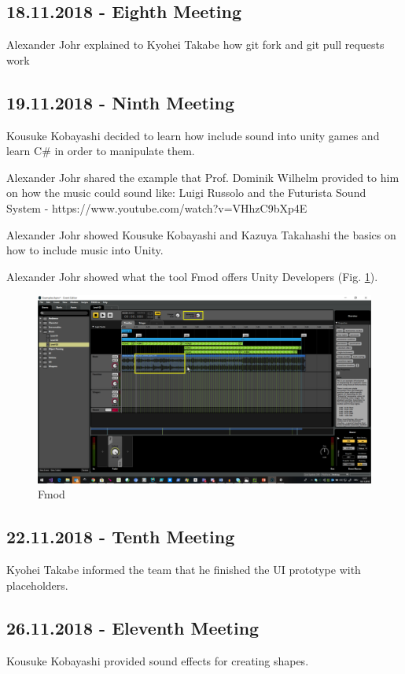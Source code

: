 \subsection{18.11.2018 - Eighth Meeting}
Alexander Johr explained to Kyohei Takabe how git fork and git pull requests work


\subsection{19.11.2018 - Ninth Meeting}
Kousuke Kobayashi decided to learn how include sound into unity games and learn C\# in order to manipulate them.

Alexander Johr shared the example that Prof. Dominik Wilhelm provided to him on how the music could sound like: Luigi Russolo and the Futurista Sound System - https://www.youtube.com/watch?v=VHhzC9bXp4E 

Alexander Johr showed Kousuke Kobayashi and Kazuya Takahashi the basics on how to include music into Unity.

Alexander Johr showed what the tool Fmod offers Unity Developers (Fig. \ref{fig:fmod}).

\begin{figure}[htbp]
	\centering
		\includegraphics[width=1.00\textwidth]{img/fmod.png}
	\caption[Fmod]{Fmod}
	\label{fig:fmod}
\end{figure}

\subsection{22.11.2018 - Tenth Meeting}
Kyohei Takabe informed the team that he finished the UI prototype with placeholders.


\subsection{26.11.2018 - Eleventh Meeting}
Kousuke Kobayashi provided sound effects for creating shapes.

